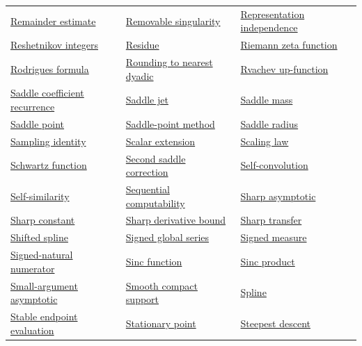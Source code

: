 \documentclass[11pt,oneside]{article}
\begin{document}
\begin{longtable}{p{}p{}p{}}
\hyperlink{gls:remainder-estimate}{Remainder estimate} & \hyperlink{gls:removable-singularity}{Removable singularity} & \hyperlink{gls:representation-independence}{Representation independence} \\
\hyperlink{gls:reshetnikov-integers}{Reshetnikov integers} & \hyperlink{gls:residue}{Residue} & \hyperlink{gls:riemann-zeta-function}{Riemann zeta function} \\
\hyperlink{gls:rodrigues-formula}{Rodrigues formula} & \hyperlink{gls:rounding-to-nearest-dyadic}{Rounding to nearest dyadic} & \hyperlink{gls:rvachev-up-function}{Rvachev up-function} \\
\hyperlink{gls:saddle-coefficient-recurrence}{Saddle coefficient recurrence} & \hyperlink{gls:saddle-jet}{Saddle jet} & \hyperlink{gls:saddle-mass}{Saddle mass} \\
\hyperlink{gls:saddle-point}{Saddle point} & \hyperlink{gls:saddle-point-method}{Saddle-point method} & \hyperlink{gls:saddle-radius}{Saddle radius} \\
\hyperlink{gls:sampling-identity}{Sampling identity} & \hyperlink{gls:scalar-extension}{Scalar extension} & \hyperlink{gls:scaling-law}{Scaling law} \\
\hyperlink{gls:schwartz-function}{Schwartz function} & \hyperlink{gls:second-saddle-correction}{Second saddle correction} & \hyperlink{gls:self-convolution}{Self-convolution} \\
\hyperlink{gls:self-similarity}{Self-similarity} & \hyperlink{gls:sequential-computability}{Sequential computability} & \hyperlink{gls:sharp-asymptotic}{Sharp asymptotic} \\
\hyperlink{gls:sharp-constant}{Sharp constant} & \hyperlink{gls:sharp-derivative-bound}{Sharp derivative bound} & \hyperlink{gls:sharp-transfer}{Sharp transfer} \\
\hyperlink{gls:shifted-spline}{Shifted spline} & \hyperlink{gls:signed-global-series}{Signed global series} & \hyperlink{gls:signed-measure}{Signed measure} \\
\hyperlink{gls:signed-natural-numerator}{Signed-natural numerator} & \hyperlink{gls:sinc-function}{Sinc function} & \hyperlink{gls:sinc-product}{Sinc product} \\
\hyperlink{gls:small-argument-asymptotic}{Small-argument asymptotic} & \hyperlink{gls:smooth-compact-support}{Smooth compact support} & \hyperlink{gls:spline}{Spline} \\
\hyperlink{gls:stable-endpoint-evaluation}{Stable endpoint evaluation} & \hyperlink{gls:stationary-point}{Stationary point} & \hyperlink{gls:steepest-descent}{Steepest descent} \\

\end{longtable}
\end{document}
